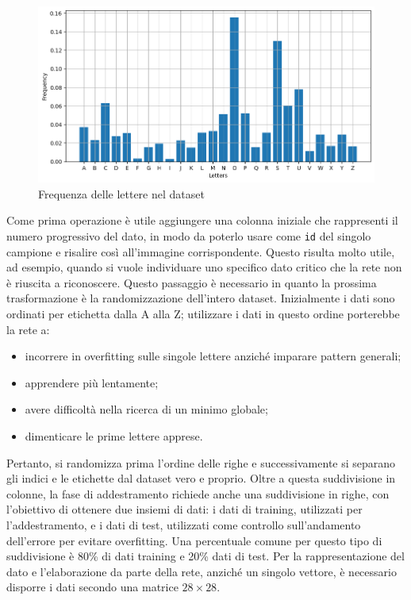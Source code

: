 \documentclass[a4paper,12pt]{article}
\begin{document}
\begin{figure}
    \centering
    \includegraphics[width=1\linewidth]{images/letters_frequency.png}
    \caption{Frequenza delle lettere nel dataset}
    \label{letters_frequency}
\end{figure}

Come prima operazione è utile aggiungere una colonna iniziale che rappresenti il numero progressivo del dato, in modo da poterlo usare come \texttt{id} del singolo campione e risalire così all'immagine corrispondente. Questo risulta molto utile, ad esempio, quando si vuole individuare uno specifico dato critico che la rete non è riuscita a riconoscere. Questo passaggio è necessario in quanto la prossima trasformazione è la randomizzazione dell'intero dataset. Inizialmente i dati sono ordinati per etichetta dalla A alla Z; utilizzare i dati in questo ordine porterebbe la rete a:
\begin{itemize}
    \item incorrere in overfitting sulle singole lettere anziché imparare pattern generali;
    \item apprendere più lentamente;
    \item avere difficoltà nella ricerca di un minimo globale;
    \item dimenticare le prime lettere apprese.
\end{itemize}
Pertanto, si randomizza prima l'ordine delle righe e successivamente si separano gli indici e le etichette dal dataset vero e proprio.
Oltre a questa suddivisione in colonne, la fase di addestramento richiede anche una suddivisione in righe, con l'obiettivo di ottenere due insiemi di dati: i dati di training, utilizzati per l'addestramento, e i dati di test, utilizzati come controllo sull'andamento dell'errore per evitare overfitting. Una percentuale comune per questo tipo di suddivisione è 80\% di dati training e 20\% dati di test.
Per la rappresentazione del dato e l'elaborazione da parte della rete, anziché un singolo vettore, è necessario disporre i dati secondo una matrice $28\times28$.
\end{document}
